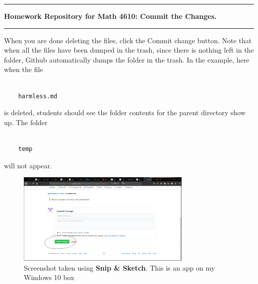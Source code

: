 \documentclass[10pt,fleqn]{article}
\begin{document}
\vskip0.1in\hrule\vskip0.1in
\noindent
{\bf Homework Repository for Math 4610: Commit the Changes.} 
\vskip0.1in\hrule\vskip0.1in
\vfill
When you are done deleting the files, click the Commit change button. Note that
when all the files have been dumped in the trash, since there is nothing left in
the folder, Github automatically dumps the folder in the trash. In the example,
here when the file 
\begin{verbatim}

    harmless.md

\end{verbatim}
is deleted, students should see the folder contents for the parent directory
show up. The folder
\begin{verbatim}

    temp

\end{verbatim}
will not appear.
\begin{figure}[h]
\centering
\includegraphics[width=0.75\textwidth]{../images/github_16.png}
\caption{{Screenshot} taken using {\bf Snip \& Sketch}. This is an app on
         my Windows 10 box}
\end{figure}
\end{document}
